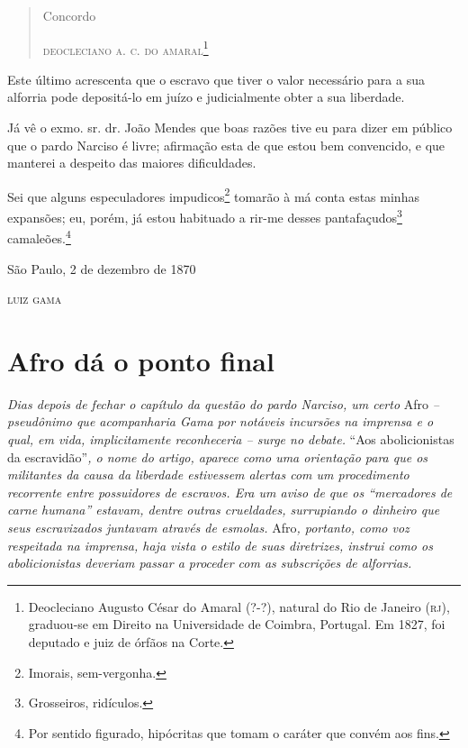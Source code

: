 {\begin{quote}
Concordo

\begin{flushright}
\textsc{deocleciano a. c. do amaral}\footnote{ Deocleciano Augusto César do
  Amaral (?-?), natural do Rio de Janeiro (\textsc{rj}), graduou-se em Direito na
  Universidade de Coimbra, Portugal. Em 1827, foi deputado e juiz de
  órfãos na Corte.}
\end{flushright}
\end{quote}

Este último acrescenta que o escravo que tiver o valor necessário para a
sua alforria pode depositá-lo em juízo e judicialmente obter a sua
liberdade.

Já vê o exmo. sr. dr. João Mendes que boas razões tive eu para dizer em
público que o pardo Narciso é livre; afirmação esta de que estou bem
convencido, e que manterei a despeito das maiores dificuldades.

Sei que alguns especuladores impudicos\footnote{ Imorais,
  sem-vergonha.} tomarão à má conta estas minhas expansões; eu, porém,
já estou habituado a rir-me desses pantafaçudos\footnote{
  Grosseiros, ridículos.} camaleões.\footnote{
  Por sentido figurado, hipócritas que tomam o caráter que convém aos
  fins.}

\begin{flushright}
São Paulo, 2 de dezembro de 1870

\textsc{luiz gama}
\end{flushright}

\part{Afro dá o ponto final}

\begin{argumento}
\emph{Dias depois de fechar o capítulo da questão do pardo Narciso, um
certo} Afro \emph{-- pseudônimo que acompanharia Gama por notáveis
incursões na imprensa e o qual, em vida, implicitamente reconheceria --
surge no debate.} ``Aos abolicionistas da escravidão''\emph{, o nome do
artigo, aparece como uma orientação para que os militantes da causa da
liberdade estivessem alertas com um procedimento recorrente entre
possuidores de escravos. Era um aviso de que os ``mercadores de carne
humana'' estavam, dentre outras crueldades, surrupiando o dinheiro que
seus escravizados juntavam através de esmolas.} Afro\emph{, portanto,
como voz respeitada na imprensa, haja vista o estilo de suas diretrizes,
instrui como os abolicionistas deveriam passar a proceder com as
subscrições de alforrias.}
\end{argumento}

}

